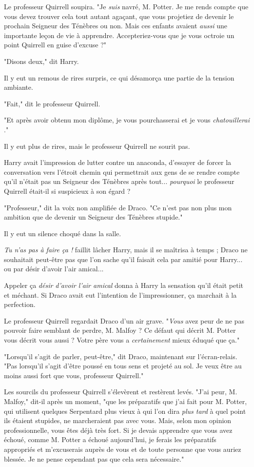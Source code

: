 Le professeur Quirrell soupira. "Je \emph{suis}  navré, M. Potter. Je me rends compte que vous devez trouver cela tout autant agaçant, que vous projetiez de devenir le prochain Seigneur des Ténèbres ou non. Mais ces enfants avaient \emph{aussi}  une importante leçon de vie à apprendre. Accepteriez-vous que je vous octroie un point Quirrell en guise d'excuse ?"

"Disons deux," dit Harry.

Il y eut un remous de rires surpris, ce qui désamorça une partie de la tension ambiante.

"Fait," dit le professeur Quirrell.

"Et après avoir obtenu mon diplôme, je vous pourchasserai et je vous \emph{chatouillerai} ."

Il y eut plus de rires, mais le professeur Quirrell ne sourit pas.

Harry avait l'impression de lutter contre un anaconda, d'essayer de forcer la conversation vers l'étroit chemin qui permettrait aux gens de se rendre compte qu'il n'était pas un Seigneur des Ténèbres après tout... \emph{pourquoi}  le professeur Quirrell était-il si suspicieux à son égard ?

"Professeur," dit la voix non amplifiée de Draco. "Ce n'est pas non plus mon ambition que de devenir un Seigneur des Ténèbres stupide."

Il y eut un silence choqué dans la salle.

\emph{Tu n'as pas à faire ça !}  faillit lâcher Harry, mais il se maîtrisa à temps ; Draco ne souhaitait peut-être pas que l'on sache qu'il faisait cela par amitié pour Harry... ou par désir d'avoir l'air amical...

Appeler ça \emph{désir d'avoir l'air amical}  donna à Harry la sensation qu'il était petit et méchant. Si Draco avait eut l'intention de l'impressionner, ça marchait à la perfection.

Le professeur Quirrell regardait Draco d'un air grave. "\emph{Vous}  avez peur de ne pas pouvoir faire semblant de perdre, M. Malfoy ? Ce défaut qui décrit M. Potter vous décrit vous aussi ? Votre père vous a \emph{certainement}  mieux éduqué que ça."

"Lorsqu'il s'agit de parler, peut-être," dit Draco, maintenant sur l'écran-relais. "Pas lorsqu'il s'agit d'être poussé en tous sens et projeté au sol. Je veux être au moins aussi fort que vous, professeur Quirrell."

Les sourcils du professeur Quirrell s'élevèrent et restèrent levés. "J'ai peur, M. Malfoy," dit-il après un moment, "que les préparatifs que j'ai fait pour M. Potter, qui utilisent quelques Serpentard plus vieux à qui l'on dira \emph{plus tard}  à quel point ils étaient stupides, ne marcheraient pas avec vous. Mais, selon mon opinion professionnelle, vous êtes déjà très fort. Si je devais apprendre que vous avez échoué, comme M. Potter a échoué aujourd'hui, je ferais les préparatifs appropriés et m'excuserais auprès de vous et de toute personne que vous auriez blessée. Je ne pense cependant pas que cela sera nécessaire."

